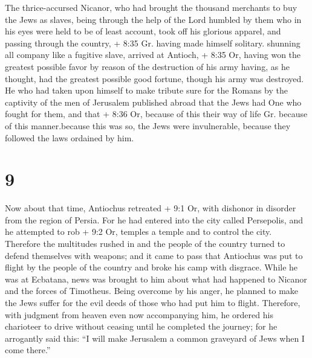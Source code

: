  The thrice-accursed Nicanor, who had brought the thousand
merchants to buy the Jews as slaves,  being through the
help of the Lord humbled by them who in his eyes were held to be of
least account, took off his glorious apparel, and passing through the
country, + 8:35 Gr. having made himself solitary. shunning all company
like a fugitive slave, arrived at Antioch, + 8:35 Or, having won the
greatest possible favor by reason of the destruction of his army having,
as he thought, had the greatest possible good fortune, though his army
was destroyed.  He who had taken upon himself to make
tribute sure for the Romans by the captivity of the men of Jerusalem
published abroad that the Jews had One who fought for them, and that +
8:36 Or, because of this their way of life Gr. because of this
manner.because this was so, the Jews were invulnerable, because they
followed the laws ordained by him.

\hypertarget{section-7}{%
\section{9}\label{section-7}}

 Now about that time, Antiochus retreated + 9:1 Or, with
dishonor in disorder from the region of Persia.  For he had
entered into the city called Persepolis, and he attempted to rob + 9:2
Or, temples a temple and to control the city. Therefore the multitudes
rushed in and the people of the country turned to defend themselves with
weapons; and it came to pass that Antiochus was put to flight by the
people of the country and broke his camp with disgrace. 
While he was at Ecbatana, news was brought to him about what had
happened to Nicanor and the forces of Timotheus.  Being
overcome by his anger, he planned to make the Jews suffer for the evil
deeds of those who had put him to flight. Therefore, with judgment from
heaven even now accompanying him, he ordered his charioteer to drive
without ceasing until he completed the journey; for he arrogantly said
this: ``I will make Jerusalem a common graveyard of Jews when I come
there.''

